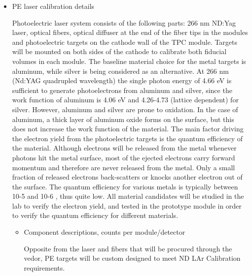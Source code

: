 \begin{itemize}
\begin{itemize}
    \end{itemize}
    \item PE laser calibration  details
   
    Photoelectric laser system consists of the following parts: 266 nm ND:Yag laser, optical fibers, optical diffuser at the end of the fiber tips in the modules and photoelectric targets on the cathode wall of the TPC module. Targets will be mounted on both sides of the cathode to calibrate both fiducial volumes in each module.  The baseline material choice for the metal targets is aluminum, while silver is being considered as an alternative. At 266 nm (Nd:YAG quadrupled wavelength) the single photon energy of 4.66 eV is sufficient to generate photoelectrons from aluminum and silver, since the work function of aluminum is 4.06 eV and 4.26-4.73 (lattice dependent) for silver. However, aluminum and silver are prone to oxidation. In the case of aluminum, a thick layer of aluminum oxide forms on the surface, but this does not increase the work function of the material. The main factor driving the electron yield from the photoelectric targets is the quantum efficiency of the material. Although electrons will be released from the metal whenever photons hit the metal surface, most of the ejected electrons carry forward momentum and therefore are never released from the metal. Only a small fraction of released electrons back-scatters or knocks another electron out of the surface. The quantum efficiency for various metals is typically between 10-5 and 10-6 , thus quite low. All material candidates will be studied in the lab to verify the electron yield, and tested in the prototype module in order to verify the quantum efficiency for different materials.



    \begin{itemize}
        \item Component descriptions, counts per module/detector
        
        Opposite from the laser and fibers that will be procured through the vedor, PE targets will be custom designed to meet ND LAr Calibration requirements.
        

\end{itemize}
\end{itemize}

